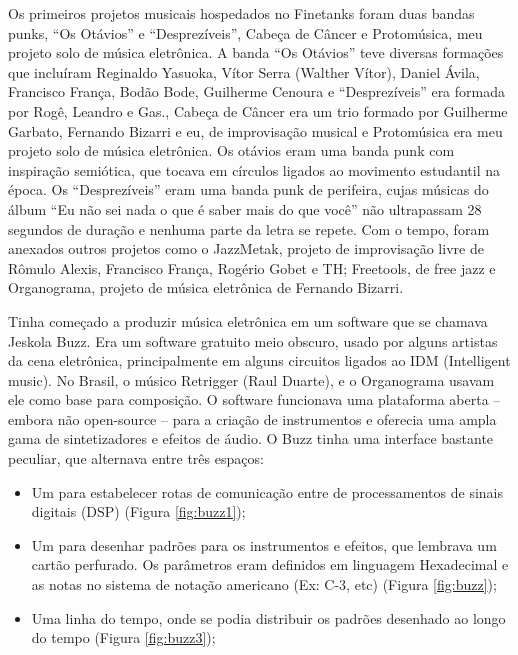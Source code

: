 Os primeiros projetos musicais hospedados no Finetanks foram duas bandas punks, ``Os Otávios'' e ``Desprezíveis'', Cabeça de Câncer e Protomúsica, meu projeto solo de música eletrônica. A banda ``Os Otávios'' teve diversas formações que incluíram Reginaldo Yasuoka, Vítor Serra (Walther Vítor), Daniel Ávila, Francisco França, Bodão Bode, Guilherme Cenoura e ``Desprezíveis'' era formada por Rogê, Leandro e Gas., Cabeça de Câncer era um trio formado por Guilherme Garbato, Fernando Bizarri e eu, de improvisação musical e Protomúsica era meu projeto solo de música eletrônica. Os otávios eram uma banda punk com inspiração semiótica, que tocava em círculos ligados ao movimento estudantil na época. Os ``Desprezíveis'' eram uma banda punk de perifeira, cujas músicas do álbum ``Eu não sei nada o que é saber mais do que você'' não ultrapassam 28 segundos de duração e nenhuma parte da letra se repete. Com o tempo, foram anexados outros projetos como o JazzMetak, projeto de improvisação livre de Rômulo Alexis, Francisco França, Rogério Gobet e TH; Freetools, de free jazz e Organograma, projeto de música eletrônica de Fernando Bizarri.

Tinha começado a produzir música eletrônica em um software que se chamava Jeskola Buzz. Era um software gratuito meio obscuro, usado por alguns artistas da cena eletrônica, principalmente em alguns circuitos ligados ao IDM (Intelligent music). No Brasil, o músico Retrigger (Raul Duarte), e o Organograma usavam ele como base para composição. O software funcionava uma plataforma aberta – embora não open-source – para a criação de instrumentos e oferecia uma ampla gama de sintetizadores e efeitos de áudio. O Buzz tinha uma interface bastante peculiar, que alternava entre três espaços:

\begin{itemize}
\item Um para estabelecer rotas de comunicação entre de processamentos de sinais digitais (DSP) (Figura \ref{fig:buzz1});
\item Um para desenhar padrões para os instrumentos e efeitos, que lembrava um cartão perfurado. Os parâmetros eram definidos em linguagem Hexadecimal e as notas no sistema de notação americano (Ex: C-3, etc) (Figura \ref{fig:buzz});
\item Uma linha do tempo, onde se podia distribuir os padrões desenhado ao longo do tempo (Figura \ref{fig:buzz3});
\end{itemize}

